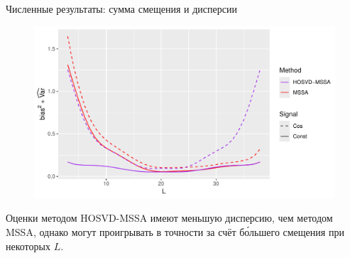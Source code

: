 \documentclass[pdf, unicode, 9pt, notheorems, handout]{beamer}
\begin{document}
    \begin{frame}{Численные результаты: сумма смещения и дисперсии}
        \begin{figure}
            \centering
            \includegraphics[width=\textwidth]{./img/approx_sep_large_noise_mse}
        \end{figure}
        Оценки методом HOSVD-MSSA имеют меньшую дисперсию, чем методом MSSA, однако могут проигрывать в точности за счёт
        б\'{о}льшего смещения при некоторых $L$.
    \end{frame}
    
\end{document}
